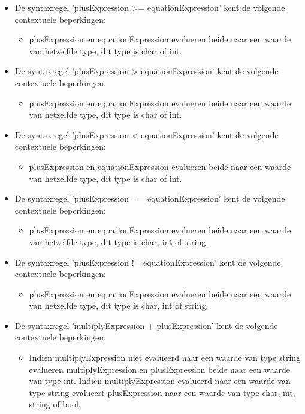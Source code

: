 \begin{itemize}
        \item De syntaxregel 'plusExpression \textgreater{}= equationExpression' kent de volgende contextuele beperkingen:
            \begin{itemize}
            \item plusExpression en equationExpression evalueren beide naar een waarde van hetzelfde type, dit type is char of int.
            \end{itemize}
        \item De syntaxregel 'plusExpression \textgreater{} equationExpression' kent de volgende contextuele beperkingen:
            \begin{itemize}
            \item plusExpression en equationExpression evalueren beide naar een waarde van hetzelfde type, dit type is char of int.
            \end{itemize}
        \item De syntaxregel 'plusExpression \textless{} equationExpression' kent de volgende contextuele beperkingen:
            \begin{itemize}
            \item plusExpression en equationExpression evalueren beide naar een waarde van hetzelfde type, dit type is char of int.
            \end{itemize}
        \item De syntaxregel 'plusExpression == equationExpression' kent de volgende contextuele beperkingen:
            \begin{itemize}
            \item plusExpression en equationExpression evalueren beide naar een waarde van hetzelfde type, dit type is char, int of string.
            \end{itemize}
        \item De syntaxregel 'plusExpression != equationExpression' kent de volgende contextuele beperkingen:
            \begin{itemize}
            \item plusExpression en equationExpression evalueren beide naar een waarde van hetzelfde type, dit type is char, int of string.
            \end{itemize}
        \item De syntaxregel 'multiplyExpression + plusExpression' kent de volgende contextuele beperkingen:
            \begin{itemize}
            \item Indien multiplyExpression niet evalueerd naar een waarde van type string evalueren multiplyExpression en plusExpression beide naar een waarde van type int. Indien multiplyExpression evalueerd naar een waarde van type string evalueert plusExpression naar een waarde van type char, int, string of bool.

\end{itemize}
\end{itemize}
